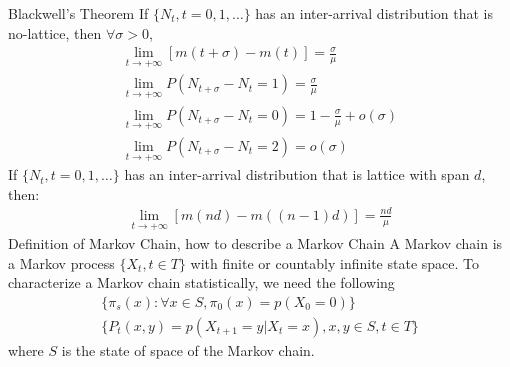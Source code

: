\documentclass[11pt]{article}
\newenvironment{field}{}{\newpage}
\newif\ifnote
\newenvironment{note}{\notetrue}{\notefalse}
\begin{document}
\begin{note}
  \begin{field}
    Blackwell's Theorem
  \end{field}
  \begin{field}
    If \(\{N_t, t = 0,1,\ldots\}\) has an inter-arrival distribution
    that is no-lattice, then \(\forall \sigma > 0\),
    \begin{align*}
      \lim_{t \to +\infty} [ m(t+\sigma) - m(t) ] = \frac{\sigma}{\mu}
      \\
      \lim_{t \to +\infty} P(N_{t + \sigma} - N_t = 1) =
      \frac{\sigma}{\mu} \\
      \lim_{t \to +\infty} P(N_{t+\sigma} - N_t = 0) = 1 -
      \frac{\sigma}{\mu} + o(\sigma) \\
      \lim_{t \to +\infty} P(N_{t+\sigma} - N_t = 2) = o(\sigma)
    \end{align*}
    If \(\{N_t, t = 0,1,\ldots\}\) has an inter-arrival distribution
    that is lattice with span \(d\), then:
    \begin{align*}
      \lim_{t \to +\infty} [ m(nd) - m((n-1)d)] = \frac{nd}{\mu}
    \end{align*}
  \end{field}
\end{note}
%
\begin{note}
  \begin{field}
    Definition of Markov Chain, how to describe a Markov Chain
  \end{field}
  \begin{field}
    A Markov chain is a Markov process \(\{X_t, t \in T\}\) with
    finite or countably infinite state space. To characterize a Markov
    chain statistically, we need the following
    \begin{align*}
      \{\pi_s(x) : \forall x \in S, \pi_0(x) = p(X_0 = 0)\} \\
      \{P_t(x, y) = p(X_{t+1} = y | X_t = x), x, y \in S, t \in T\}
    \end{align*}
    where \(S\) is the state of space of the Markov chain.
  \end{field}
\end{note}
\end{document}
